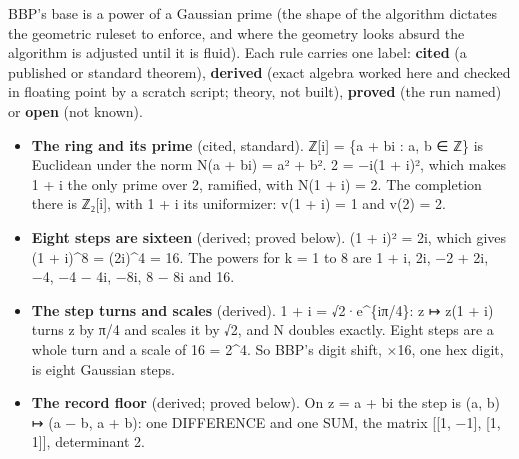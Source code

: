 BBP's base is a power of a Gaussian prime (the shape of the algorithm dictates the geometric ruleset to enforce, and where the geometry looks absurd the algorithm is adjusted until it is fluid). Each rule carries one label: \textbf{cited} (a published or standard theorem), \textbf{derived} (exact algebra worked here and checked in floating point by a scratch script; theory, not built), \textbf{proved} (the run named) or \textbf{open} (not known).

\begin{itemize}
\item \textbf{The ring and its prime} (cited, standard). ℤ[i] = \{a + bi : a, b ∈ ℤ\} is Euclidean under the norm N(a + bi) = a² + b². 2 = −i(1 + i)², which makes 1 + i the only prime over 2, ramified, with N(1 + i) = 2. The completion there is ℤ₂[i], with 1 + i its uniformizer: v(1 + i) = 1 and v(2) = 2.
\item \textbf{Eight steps are sixteen} (derived; proved below). (1 + i)² = 2i, which gives (1 + i)\textasciicircum{}8 = (2i)\textasciicircum{}4 = 16. The powers for k = 1 to 8 are 1 + i, 2i, −2 + 2i, −4, −4 − 4i, −8i, 8 − 8i and 16.
\item \textbf{The step turns and scales} (derived). 1 + i = √2·e\textasciicircum{}\{iπ/4\}: z ↦ z(1 + i) turns z by π/4 and scales it by √2, and N doubles exactly. Eight steps are a whole turn and a scale of 16 = 2\textasciicircum{}4. So BBP's digit shift, ×16, one hex digit, is eight Gaussian steps.
\item \textbf{The record floor} (derived; proved below). On z = a + bi the step is (a, b) ↦ (a − b, a + b): one DIFFERENCE and one SUM, the matrix [[1, −1], [1, 1]], determinant 2.


\end{itemize}
